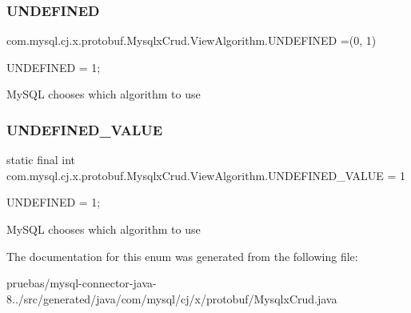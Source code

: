 \subsubsection{\texorpdfstring{U\+N\+D\+E\+F\+I\+N\+ED}{UNDEFINED}}
{\footnotesize\ttfamily com.\+mysql.\+cj.\+x.\+protobuf.\+Mysqlx\+Crud.\+View\+Algorithm.\+U\+N\+D\+E\+F\+I\+N\+ED =(0, 1)}

{\ttfamily U\+N\+D\+E\+F\+I\+N\+ED = 1;}


\begin{DoxyPre}
MySQL chooses which algorithm to use
\end{DoxyPre}
 \mbox{\label{enumcom_1_1mysql_1_1cj_1_1x_1_1protobuf_1_1_mysqlx_crud_1_1_view_algorithm_ae9e60d6bb88e5019b546bd50fc6d0c42}} 
\subsubsection{\texorpdfstring{U\+N\+D\+E\+F\+I\+N\+E\+D\+\_\+\+V\+A\+L\+UE}{UNDEFINED\_VALUE}}
{\footnotesize\ttfamily  static  final int com.\+mysql.\+cj.\+x.\+protobuf.\+Mysqlx\+Crud.\+View\+Algorithm.\+U\+N\+D\+E\+F\+I\+N\+E\+D\+\_\+\+V\+A\+L\+UE = 1\hspace{0.3cm}{\ttfamily [static]}}

{\ttfamily U\+N\+D\+E\+F\+I\+N\+ED = 1;}


\begin{DoxyPre}
MySQL chooses which algorithm to use
\end{DoxyPre}
 

The documentation for this enum was generated from the following file\+:\begin{DoxyCompactItemize}
\item 
pruebas/mysql-\/connector-\/java-\/8../src/generated/java/com/mysql/cj/x/protobuf/Mysqlx\+Crud.\+java\end{DoxyCompactItemize}
